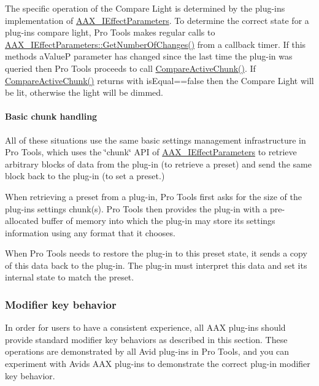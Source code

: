 The specific operation of the Compare Light is determined by the plug-\/in\textquotesingle{}s implementation of \mbox{\hyperlink{a01825}{A\+A\+X\+\_\+\+I\+Effect\+Parameters}}. To determine the correct state for a plug-\/in\textquotesingle{}s compare light, Pro Tools makes regular calls to \mbox{\hyperlink{a01669_a17b96da201d9a242d3662e87525a7227}{A\+A\+X\+\_\+\+I\+Effect\+Parameters\+::\+Get\+Number\+Of\+Changes()}} from a callback timer. If this method\textquotesingle{}s {\ttfamily a\+ValueP} parameter has changed since the last time the plug-\/in was queried then Pro Tools proceeds to call \mbox{\hyperlink{a01669_a1e86f849e970c9998313fc7d451ccf85}{Compare\+Active\+Chunk()}}. If \mbox{\hyperlink{a01669_a1e86f849e970c9998313fc7d451ccf85}{Compare\+Active\+Chunk()}} returns with {\ttfamily is\+Equal==false} then the Compare Light will be lit, otherwise the light will be dimmed.

\hypertarget{a00830_subsubsection__basic_chunk_handling_}{}\paragraph{Basic chunk handling}\label{a00830_subsubsection__basic_chunk_handling_}
 All of these situations use the same basic settings management infrastructure in Pro Tools, which uses the \char`\"{}chunk\char`\"{} A\+PI of \mbox{\hyperlink{a01825}{A\+A\+X\+\_\+\+I\+Effect\+Parameters}} to retrieve arbitrary blocks of data from the plug-\/in (to retrieve a preset) and send the same block back to the plug-\/in (to set a preset.)

When retrieving a preset from a plug-\/in, Pro Tools first asks for the size of the plug-\/in\textquotesingle{}s settings chunk(s). Pro Tools then provides the plug-\/in with a pre-\/allocated buffer of memory into which the plug-\/in may store its settings information using any format that it chooses.

When Pro Tools needs to restore the plug-\/in to this preset state, it sends a copy of this data back to the plug-\/in. The plug-\/in must interpret this data and set its internal state to match the preset.

\hypertarget{a00830_subsection__modifier_key_behavior_}{}\subsubsection{Modifier key behavior}\label{a00830_subsection__modifier_key_behavior_}
 In order for users to have a consistent experience, all A\+AX plug-\/ins should provide standard modifier key behaviors as described in this section. These operations are demonstrated by all Avid plug-\/ins in Pro Tools, and you can experiment with Avid\textquotesingle{}s A\+AX plug-\/ins to demonstrate the correct plug-\/in modifier key behavior.


